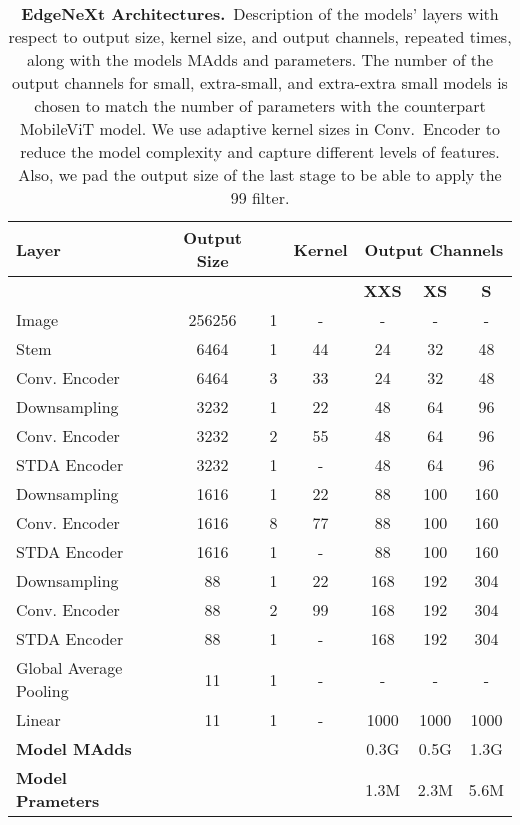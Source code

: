 \documentclass[runningheads]{llncs}
\renewcommand\arraystretch{1.0}
\begin{document}
\begin{table*}[!t]
\setlength{\tabcolsep}{6pt}
\renewcommand\arraystretch{1.0}
\caption{\textbf{EdgeNeXt Architectures.}~Description of the models' layers with respect to output size, kernel size, and output channels, repeated  times, along with the models MAdds and parameters. The number of the output channels for small, extra-small, and extra-extra small models is chosen to match the number of parameters with the counterpart MobileViT model. We use adaptive kernel sizes in Conv.~Encoder to reduce the model complexity and capture different levels of features. Also, we pad the output size of the last stage to be able to apply the 99 filter.}
\begin{center}
\begin{tabular}{l c c c c c c}
\toprule
\rowcolor{Gray} Layer     &  Output Size &   & Kernel & \multicolumn{3}{c}{Output Channels}\\
\midrule
 &   &   &    & \textbf{XXS} & \textbf{XS} & \textbf{S} \\
\midrule
Image & 256256 & 1 & - & - & - & - \\
\midrule
Stem & 6464 & 1  & 44 & 24 & 32 & 48\\
Conv. Encoder & 6464 &  3 & 33 & 24 & 32 & 48\\
\midrule
Downsampling & 3232 &  1 & 22 & 48 & 64 & 96\\
Conv. Encoder & 3232 &  2 & 55 & 48 & 64 & 96\\
STDA Encoder & 3232 &  1 & - & 48 & 64 & 96\\
\midrule
Downsampling & 1616 &  1 & 22 & 88 & 100 & 160\\
Conv. Encoder & 1616 &  8 & 77 & 88 & 100 & 160\\
STDA Encoder & 1616 &  1 & - &  88 & 100 & 160\\
\midrule
Downsampling & 88 &  1 & 22 & 168 & 192 & 304\\
Conv. Encoder & 88 &  2 & 99 & 168 & 192 & 304\\
STDA Encoder & 88 &  1 & - &  168 & 192 & 304\\
\midrule
Global Average Pooling & 11 &  1 & - & - & - & -\\
Linear & 11 & 1 & - &  1000 & 1000 & 1000\\
\midrule
\textbf{Model MAdds}  &  &   &  & 0.3G & 0.5G & 1.3G\\
\textbf{Model Prameters}  &  &   &  & 1.3M & 2.3M & 5.6M\\
\bottomrule 
\end{tabular}
\label{METH:tab1}
\end{center}
\end{table*}
\end{document}
